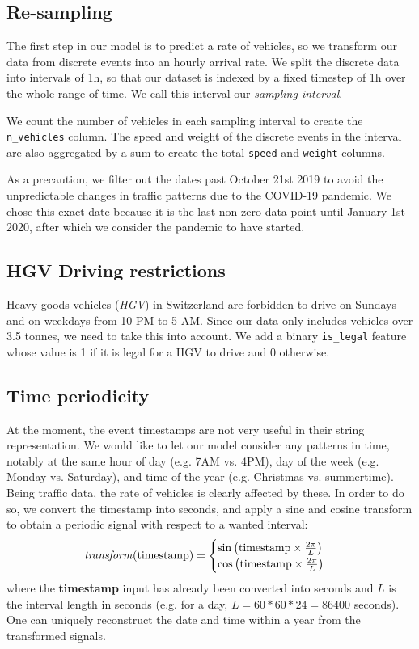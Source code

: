\documentclass[10pt,conference,compsocconf]{IEEEtran}
\begin{document}
\subsection{Re-sampling}

The first step in our model is to predict a rate of vehicles, so we transform our data from discrete
events into an hourly arrival rate. We split the discrete data into intervals of 1h, so that our dataset
is indexed by a fixed timestep of 1h over the whole range of time. We call this interval our \textit{sampling interval}. 

We count the number of vehicles in each sampling interval to create the \texttt{n\_vehicles} column. The speed and weight of the discrete events in the interval are also aggregated by a sum to create the total \texttt{speed} and \texttt{weight} columns.

As a precaution, we filter out the dates past October 21st 2019 to avoid the unpredictable changes in traffic patterns due to the COVID-19 pandemic. We chose this exact date because it is the last non-zero
data point until January 1st 2020, after which we consider the pandemic to have started.

\subsection{HGV Driving restrictions}

Heavy goods vehicles (\textit{HGV}) in Switzerland are forbidden to drive on Sundays and on weekdays from 10 PM to 5
AM. Since our data only includes vehicles over 3.5 tonnes, we need to take this into account. We add a
binary \texttt{is\_legal} feature whose value is 1 if it is legal for a HGV to drive and 0 otherwise.

\subsection{Time periodicity}
At the moment, the event timestamps are not very useful in their string representation. We would like to let our model consider any patterns in time, notably at the same hour of day (e.g. 7AM vs. 4PM), day of the week (e.g. Monday vs. Saturday), and time of the year (e.g. Christmas vs. summertime). Being traffic data, the rate of vehicles is clearly affected by these. In order to do so, we convert the timestamp into seconds, and apply a sine and cosine transform to obtain a periodic signal with respect to a wanted interval:
\[ 
\textrm{\textit{transform}(timestamp)} = \begin{cases}
    \sin \left( \textrm{timestamp} \times \frac{2\pi}{L} \right) \\
    \cos \left( \textrm{timestamp} \times \frac{2\pi}{L} \right)
\end{cases}
\]
where the \textbf{timestamp} input has already been converted into seconds and $L$ is the interval length in seconds (e.g. for a day, $L=60*60*24=86400$ seconds). One can uniquely reconstruct the date and time within a year from the transformed signals. 
\end{document}
